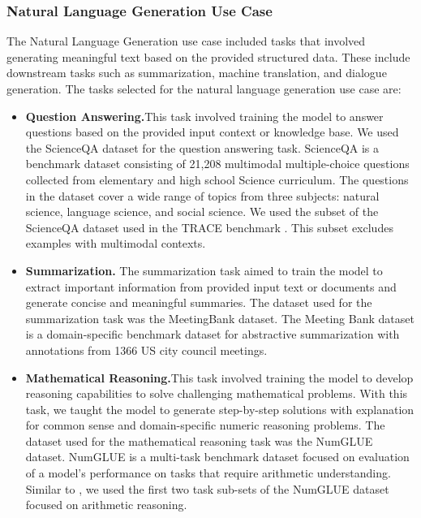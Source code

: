 \subsubsection{Natural Language Generation Use Case} \label{Natural Language Generation Use Case}
The Natural Language Generation use case included tasks that involved generating meaningful text based on the provided structured data. These include downstream tasks such as summarization, machine translation, and dialogue generation. 
The tasks selected for the natural language generation use case are:
\begin{itemize}
\item \textbf{Question Answering.}This task involved training the model to answer questions based on the provided input context or knowledge base. We used the ScienceQA dataset for the question answering task. ScienceQA \cite{lu2022learn} is a benchmark dataset consisting of 21,208 multimodal multiple-choice questions collected from elementary and high school Science curriculum. The questions in the dataset cover a wide range of topics from three subjects: natural science, language science, and social science. We used the subset of the ScienceQA dataset used in the TRACE benchmark \cite{wang2023trace}. This subset excludes examples with multimodal contexts. 

\item \textbf{Summarization.} The summarization task aimed to train the model to extract important information from provided input text or documents and generate concise and meaningful summaries. The dataset used for the summarization task was the MeetingBank dataset. The Meeting Bank dataset \cite{hu2023meetingbank} is a domain-specific benchmark dataset for abstractive summarization with annotations from 1366 US city council meetings.

\item \textbf{Mathematical Reasoning.}This task involved training the model to develop reasoning capabilities to solve challenging mathematical problems. With this task, we taught the model to generate step-by-step solutions with explanation for common sense and domain-specific numeric reasoning problems. The dataset used for the mathematical reasoning task was the NumGLUE dataset. NumGLUE \cite{mishra2022numglue} is a multi-task benchmark dataset focused on evaluation of a model’s performance on tasks that require arithmetic understanding. Similar to \cite{wang2023trace}, we used the first two task sub-sets of the NumGLUE dataset focused on arithmetic reasoning.
\end{itemize}

